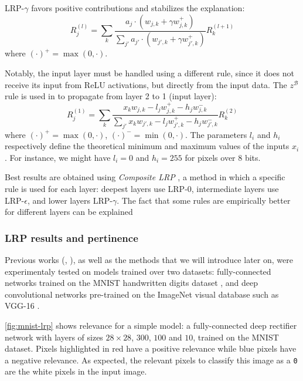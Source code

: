 \documentclass[twocolumn]{../cs-classes/cs-classes}
\newcommand*{\1}{\digitsbb{1}}
\newcommand*{\0}{\digitsbb{0}}
\begin{document}
LRP-$\gamma$ favors positive contributions and stabilizes the explanation:
\begin{equation*}
    \tag{LRP-$\gamma$}
    R^{(l)}_j = \sum_{k}\frac{a_j\cdot(w_{j, k} + \gamma w_{j,k}^+)}{\sum_{j'}a_{j'}\cdot(w_{j', k}+ \gamma w_{j',k}^+)} R^{(l+1)}_k
\end{equation*}
where $(\cdot)^+=\max(0, \cdot)$.

Notably, the input layer must be handled using a different rule, since it does not receive its input from ReLU activations, but directly from the input data. The $z^\mathcal{B}$ rule is used in \cite{montavon-lrp} to propagate from layer 2 to 1 (input layer):
\begin{equation}
    R^{(1)}_j = \sum_{k} \frac{x_kw_{j, k} - l_jw^+_{j, k} - h_jw_{j, k}^-}{\sum_{j'}x_kw_{j', k} - l_jw^+_{j', k} - h_jw_{j', k}^-} R^{(2)}_k
\end{equation}
where $(\cdot)^+=\max(0, \cdot)$, $(\cdot)^-=\min(0, \cdot)$. The parameters $l_i$ and $h_i$ respectively define the theoretical minimum and maximum values of the inputs $x_i$. For instance, we might have $l_i=0$ and $h_i=255$ for pixels over 8 bits.

Best results are obtained using \emph{Composite LRP} \cite{montavon-lrp}, a method in which a specific rule is used for each layer: deepest layers use LRP-0, intermediate layers use LRP-$\epsilon$, and lower layers LRP-$\gamma$. The fact that some rules are empirically better for different layers can be explained 

\subsubsection{LRP results and pertinence}
Previous works (\cite{bach-2015}, \cite{montavon-lrp}), as well as the methods that we will introduce later on, were experimentaly tested on models trained over two datasets: fully-connected networks trained on the MNIST handwritten digits dataset \cite{mnist-dataset}, and deep convolutional networks pre-trained on the ImageNet visual database such as VGG-16 \cite{vgg}.

\autoref{fig:mnist-lrp} shows relevance for a simple model: a fully-connected deep rectifier network with layers of sizes $28\times28$, $300$, $100$ and $10$, trained on the MNIST dataset. Pixels highlighted in red have a positive relevance while blue pixels have a negative relevance. As expected, the relevant pixels to classify this image as a \texttt{0} are the white pixels in the input image.
\end{document}
